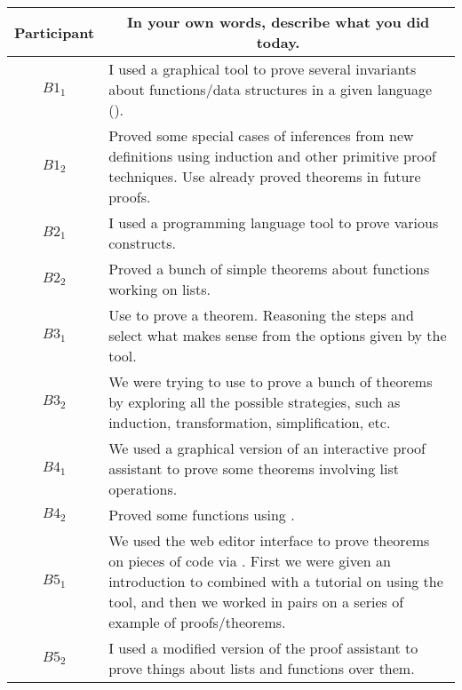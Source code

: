 \clearpage

\noindent
\begin{tabularx}{\linewidth}{@{}cX@{}}
  \toprule
  Participant & \multicolumn{1}{c}{
    \textbf{In your own words, describe what you did today.}
  } \\ \midrule
  $B1_{1}$ & I used a graphical tool to prove several invariants about functions/data structures in a given language (\Coq{}). \\
  $B1_{2}$ & Proved some special cases of inferences from new definitions using induction and other primitive proof techniques.  Use already proved theorems in future proofs. \\
  $B2_{1}$ & I used a programming language tool to prove various constructs. \\
  $B2_{2}$ & Proved a bunch of simple theorems about functions working on lists. \\
  $B3_{1}$ & Use \Coq{} to prove a theorem.  Reasoning the steps and select what makes sense from the options given by the tool. \\
  $B3_{2}$ & We were trying to use \PeaCoq{} to prove a bunch of theorems by exploring all the possible strategies, such as induction, transformation, simplification, etc. \\
  $B4_{1}$ & We used a graphical version of an interactive proof assistant to prove some theorems involving list operations. \\
  $B4_{2}$ & Proved some functions using \PeaCoq{}. \\
  $B5_{1}$ & We used the \PeaCoq{} web editor interface to prove theorems on pieces of code via \Coq{}.  First we were given an introduction to \Coq{} combined with a tutorial on using the tool, and then we worked in pairs on a series of example of proofs/theorems. \\
  $B5_{2}$ & I used a modified version of the \Coq{} proof assistant to prove things about lists and functions over them. \\
  \bottomrule
\end{tabularx}{\parfillskip=0pt\par}

\clearpage

